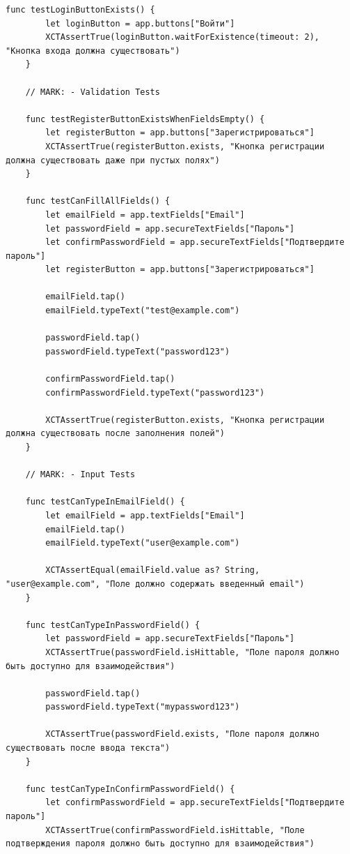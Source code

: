 \begin{lstlisting}[basicstyle=\tiny\ttfamily,breaklines=true]
    func testLoginButtonExists() {
        let loginButton = app.buttons["Войти"]
        XCTAssertTrue(loginButton.waitForExistence(timeout: 2), "Кнопка входа должна существовать")
    }

    // MARK: - Validation Tests

    func testRegisterButtonExistsWhenFieldsEmpty() {
        let registerButton = app.buttons["Зарегистрироваться"]
        XCTAssertTrue(registerButton.exists, "Кнопка регистрации должна существовать даже при пустых полях")
    }

    func testCanFillAllFields() {
        let emailField = app.textFields["Email"]
        let passwordField = app.secureTextFields["Пароль"]
        let confirmPasswordField = app.secureTextFields["Подтвердите пароль"]
        let registerButton = app.buttons["Зарегистрироваться"]

        emailField.tap()
        emailField.typeText("test@example.com")

        passwordField.tap()
        passwordField.typeText("password123")

        confirmPasswordField.tap()
        confirmPasswordField.typeText("password123")

        XCTAssertTrue(registerButton.exists, "Кнопка регистрации должна существовать после заполнения полей")
    }

    // MARK: - Input Tests

    func testCanTypeInEmailField() {
        let emailField = app.textFields["Email"]
        emailField.tap()
        emailField.typeText("user@example.com")

        XCTAssertEqual(emailField.value as? String, "user@example.com", "Поле должно содержать введенный email")
    }

    func testCanTypeInPasswordField() {
        let passwordField = app.secureTextFields["Пароль"]
        XCTAssertTrue(passwordField.isHittable, "Поле пароля должно быть доступно для взаимодействия")

        passwordField.tap()
        passwordField.typeText("mypassword123")

        XCTAssertTrue(passwordField.exists, "Поле пароля должно существовать после ввода текста")
    }

    func testCanTypeInConfirmPasswordField() {
        let confirmPasswordField = app.secureTextFields["Подтвердите пароль"]
        XCTAssertTrue(confirmPasswordField.isHittable, "Поле подтверждения пароля должно быть доступно для взаимодействия")


\end{lstlisting}
